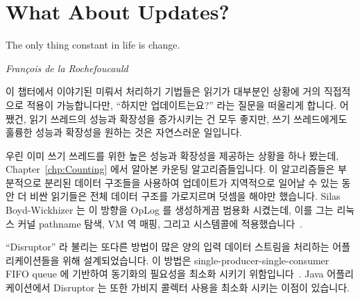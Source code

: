 
\section{What About Updates?}
\label{sec:defer:What About Updates?}
%
\epigraph{The only thing constant in life is change.}
	 {\emph{Fran\c{c}ois de la Rochefoucauld}}

이 챕터에서 이야기된 미뤄서 처리하기 기법들은 읽기가 대부분인 상황에 거의
직접적으로 적용이 가능합니다만, ``하지만 업데이트는요?'' 라는 질문을 떠올리게
합니다.
어쨌건, 읽기 쓰레드의 성능과 확장성을 증가시키는 건 모두 좋지만, 쓰기
쓰레드에게도 훌륭한 성능과 확장성을 원하는 것은 자연스러운 일입니다.

우린 이미 쓰기 쓰레드를 위한 높은 성능과 확장성을 제공하는 상황을 하나 봤는데,
Chapter~\ref{chp:Counting} 에서 알아본 카운팅 알고리즘들입니다.
이 알고리즘들은 부분적으로 분리된 데이터 구조들을 사용하여 업데이트가
지역적으로 일어날 수 있는 동안 더 비싼 읽기들은 전체 데이터 구조를 가로지르며
덧셈을 해야만 했습니다.
Silas Boyd-Wickhizer 는 이 방향을 OpLog 를 생성하게끔 범용화 시켰는데, 이를
그는 리눅스 커널 pathname 탐색, VM 역 매핑, 그리고  시스템콜에
적용했습니다~\cite{SilasBoydWickizerPhD}.

\iffalse

The deferred-processing techniques called out in this chapter are most
directly applicable to read-mostly situations, which begs the question
``But what about updates?''
After all, increasing the performance and scalability of readers is all
well and good, but it is only natural to also want great performance and
scalability for writers.

We have already seen one situation featuring high performance and
scalability for writers, namely the counting algorithms surveyed in
Chapter~\ref{chp:Counting}.
These algorithms featured partially partitioned data structures so
that updates can operate locally, while the more-expensive reads
must sum across the entire data structure.
Silas Boyd-Wickhizer has generalized this notion to produce
OpLog, which he has applied to
Linux-kernel pathname lookup, VM reverse mappings, and the \co{stat()} system
call~\cite{SilasBoydWickizerPhD}.

\fi

``Disruptor'' 라 불리는 또다른 방법이 많은 양의 입력 데이터 스트림을 처리하는
어플리케이션들을 위해 설계되었습니다.
이 방법은 single-producer-single-consumer FIFO queue 에 기반하여 동기화의
필요성을 최소화 시키기 위함입니다~\cite{AdrianSutton2013LCA:Disruptor}.
Java 어플리케이션에서 Disruptor 는 또한 가비지 콜렉터 사용을 최소화 시키는
이점이 있습니다.


